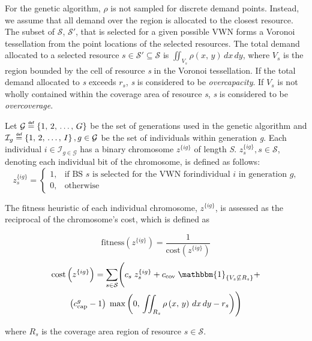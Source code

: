 \documentclass[12pt,dvipsnames]{report}
\newcommand\defeq{\mathrel{\overset{\makebox[0pt]{\mbox{\normalfont\tiny\sffamily def}}}{=}}}
\begin{document}
For the genetic algorithm, $\rho$ is not sampled for discrete demand points.  Instead, we assume that all demand over the region is allocated to the closest resource.  The subset of $\mathcal{S}$, $\mathcal{S}'$, that is selected for a given possible VWN forms a Voronoi tessellation from the point locations of the selected resources.  The total demand allocated to a selected resource $s \in \mathcal{S}' \subseteq \mathcal{S}$ is $\iint_{V_s} \rho\left(x,\, y\right) \,dx \,dy$, where $V_s$ is the region bounded by the cell of resource \textit{s} in the Voronoi tessellation.  If the total demand allocated to \textit{s} exceeds $r_s$, \textit{s} is considered to be \textit{overcapacity}.  If $V_s$ is not wholly contained within the coverage area of resource \textit{s}, \textit{s} is considered to be \textit{overcoverage}.

Let $\mathcal{G} \defeq \left\{1,\, 2,\, \ldots,\, G\right\}$ be the set of generations used in the genetic algorithm and $\mathcal{I}_g \defeq \left\{1,\, 2,\, \ldots,\, I\right\}, g \in \mathcal{G}$ be the set of individuals within generation \textit{g}.  Each individual $i \in \mathcal{I}_{g \in \mathcal{G}}$ has a binary chromosome $z^{\{ig\}}$ of length \textit{S}.  $z_s^{\{ig\}}, s \in \mathcal{S}$, denoting each individual bit of the chromosome, is defined as follows:
\[ z_s^{\{ig\}} =
	\begin{cases}
		1,& \text{if BS $s$ is selected for the VWN for} \text{individual $i$ in generation $g$,}\\
		0,& \text{otherwise}
	\end{cases}
\]

The fitness heuristic of each individual chromosome, $z^{\{ig\}}$, is assessed as the reciprocal of the chromosome's cost, which is defined as

\begin{equation} \label{eq:GAFit}
\text{fitness}\left(z^{\{ig\}}\right) = \frac{1}{\text{cost}\left(z^{\{ig\}}\right)}
\end{equation}
\begin{multline} \label{eq:GACost}
\text{cost}\left(z^{\{ig\}}\right) = \sum_{s \in \mathcal{S}} \Biggl( c_s \; z_s^{\{ig\}} + c_\text{cov} \; \mathbbm{1}_{\left\{ V_s \not\subseteq R_s \right\}} + \\ \left(c_\text{cap}^g - 1\right) \; \max\left( 0,\, \iint_{R_s} \rho\left(x,\, y\right)\, dx\, dy - r_s \right) \Biggr)
\end{multline}

\noindent where $R_s$ is the coverage area region of resource $s \in \mathcal{S}$.
\end{document}
